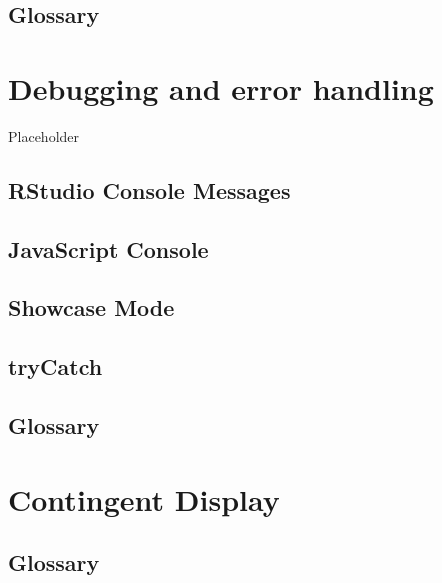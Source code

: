 \documentclass[
]{book}
\begin{document}
\hypertarget{glossary-structure}{%
\section{Glossary}\label{glossary-structure}}

\hypertarget{debugging}{%
\chapter{Debugging and error handling}\label{debugging}}

Placeholder

\hypertarget{rstudio-console-messages}{%
\section{RStudio Console Messages}\label{rstudio-console-messages}}

\hypertarget{javascript-console}{%
\section{JavaScript Console}\label{javascript-console}}

\hypertarget{showcase-mode}{%
\section{Showcase Mode}\label{showcase-mode}}

\hypertarget{trycatch}{%
\section{tryCatch}\label{trycatch}}

\hypertarget{glossary-debugging}{%
\section{Glossary}\label{glossary-debugging}}

\hypertarget{contingency}{%
\chapter{Contingent Display}\label{contingency}}

\hypertarget{glossary-contingency}{%
\section{Glossary}\label{glossary-contingency}}
\end{document}
